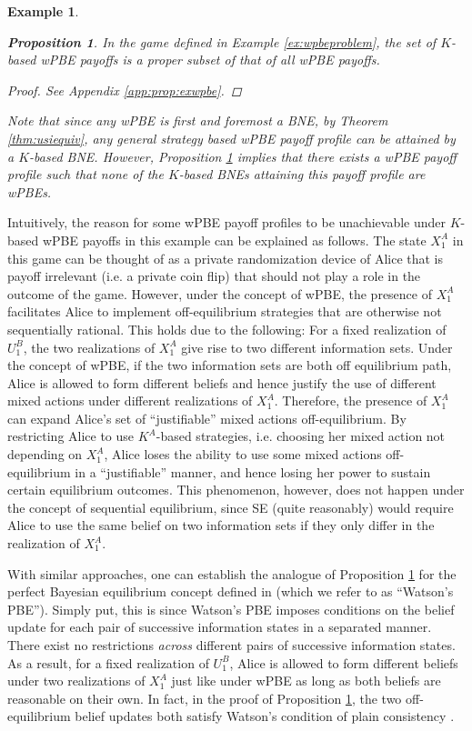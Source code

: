 \documentclass[pdflatex,sn-basic]{sn-jnl}
\newcommand{\Comp}{K}
\theoremstyle{thmstyleone}%
\newtheorem{prop}{Proposition}
\theoremstyle{thmstyletwo}%
\theoremstyle{thmstylethree}%
\newtheorem{example}{Example}
\begin{document}
\begin{example}
	\begin{prop}\label{prop:exwpbe}
		In the game defined in Example \ref{ex:wpbeproblem}, the set of $\Comp$-based wPBE payoffs is a proper subset of that of all wPBE payoffs.
	\end{prop}
    \begin{proof}
        See Appendix \ref{app:prop:exwpbe}.
    \end{proof}
	
	Note that since any wPBE is first and foremost a BNE, by Theorem \ref{thm:usiequiv}, any general strategy based wPBE payoff profile can be attained by a $\Comp$-based BNE. However, Proposition \ref{prop:exwpbe} implies that there exists a wPBE payoff profile such that none of the $\Comp$-based BNEs attaining this payoff profile are wPBEs.
\end{example}

Intuitively, the reason for some wPBE payoff profiles to be unachievable under $\Comp$-based wPBE payoffs in this example can be explained as follows. The state $X_1^A$ in this game can be thought of as a private randomization device of Alice that is payoff irrelevant (i.e. a private coin flip) that should not play a role in the outcome of the game. However, under the concept of wPBE, the presence of $X_1^A$ facilitates Alice to implement off-equilibrium strategies that are otherwise not sequentially rational. This holds due to the following: For a fixed realization of $U_1^B$, the two realizations of $X_1^A$ give rise to two different information sets. Under the concept of wPBE, if the two information sets are both off equilibrium path, Alice is allowed to form different beliefs and hence justify the use of different mixed actions under different realizations of $X_1^A$. Therefore, the presence of $X_1^A$ can expand Alice's set of ``justifiable'' mixed actions off-equilibrium. By restricting Alice to use $\Comp^A$-based strategies, i.e. choosing her mixed action not depending on $X_1^A$, Alice loses the ability to use some mixed actions off-equilibrium in a ``justifiable'' manner, and hence losing her power to sustain certain equilibrium outcomes. This phenomenon, however, does not happen under the concept of sequential equilibrium, since SE (quite reasonably) would require Alice to use the same belief on two information sets if they only differ in the realization of $X_1^A$.

With similar approaches, one can establish the analogue of Proposition \ref{prop:exwpbe} for the perfect Bayesian equilibrium concept defined in \cite{watson2017general} (which we refer to as ``Watson's PBE''). Simply put, this is since Watson's PBE imposes conditions on the belief update for each pair of successive information states in a separated manner. There exist no restrictions \emph{across} different pairs of successive information states. As a result, for a fixed realization of $U_1^B$, Alice is allowed to form different beliefs under two realizations of $X_1^A$ just like under wPBE as long as both beliefs are reasonable on their own. In fact, in the proof of Proposition \ref{prop:exwpbe}, the two off-equilibrium belief updates both satisfy Watson's condition of plain consistency \citep{watson2017general}. 
\end{document}

